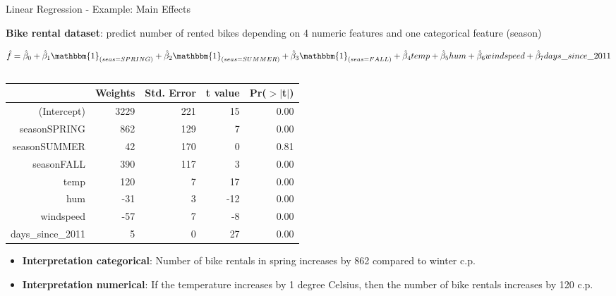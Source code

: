 \documentclass[11pt,compress,t,notes=noshow, aspectratio=169, xcolor=table]{beamer}
\begin{document}
\begin{frame}{Linear Regression - Example: Main Effects}

\textbf{Bike rental dataset}: predict number of rented bikes depending on 4 numeric features and one categorical feature (season)
\begin{footnotesize}
$$
\hat f = \hat \beta_0 + \hat \beta_1 \mathbbm{1}_{(seas = SPRING)} + \hat \beta_2 \mathbbm{1}_{(seas = SUMMER)} + \hat \beta_3 \mathbbm{1}_{(seas = FALL)} + \hat \beta_4 temp + \hat \beta_5 hum + \hat \beta_6 windspeed + \hat \beta_7 days\_since\_2011
$$
\end{footnotesize}
\vspace*{-0.3cm}
\begin{columns}[T]
\begin{column}{0.52\textwidth}
\begin{tiny}
\begin{table}[ht]
\centering
\begin{tabular}{rrrrr}
  \hline
 & Weights & Std. Error & t value & Pr($>$$|$t$|$) \\ 
  \hline
(Intercept) & 3229 & 221 & 15 & 0.00 \\ 
  seasonSPRING & 862 & 129 & 7 & 0.00 \\ 
  seasonSUMMER & 42 & 170 & 0 & 0.81 \\ 
  seasonFALL & 390 & 117 & 3 & 0.00 \\ 
  temp & 120 & 7 & 17 & 0.00 \\ 
  hum & -31 & 3 & -12 & 0.00 \\ 
  windspeed & -57 & 7 & -8 & 0.00 \\ 
  days\_since\_2011 & 5 & 0 & 27 & 0.00 \\ 
   \hline
\end{tabular}
\end{table}
\end{tiny}
\begin{itemize}
    \item \textbf{Interpretation categorical}: Number of bike rentals in spring increases by 862 compared to winter c.p.
    \item \textbf{Interpretation numerical}: If the temperature increases by 1 degree Celsius, then the number of bike rentals increases by 120 c.p.
\end{itemize}
%
\end{column}\hfill
\begin{column}{0.47\textwidth}  %

\end{column}
\end{columns}
\end{frame}
\end{document}

